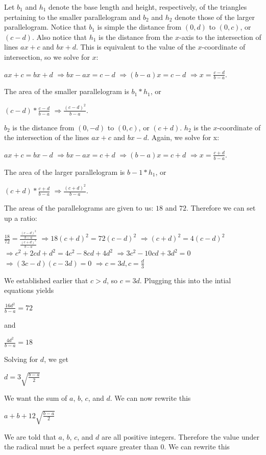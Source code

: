 \begin{enumerate}
 Let $b_1$ and $h_1$ denote the base length and height, respectively, of the triangles pertaining to the smaller parallelogram and $b_2$ and $h_2$ denote those of the larger parallelogram. Notice that $b_1$ is simple the distance from $(0, d)$ to $(0, c)$, or $(c-d)$. Also notice that $h_1$ is the distance from the $x$-axis to the intersection of lines $ax+c$ and $bx+d$. This is equivalent to the value of the $x$-coordinate of intersection, so we solve for $x$:

 
$ax+c=bx+d$
$\Rightarrow bx-ax = c-d$
$\Rightarrow (b-a)x = c-d$
$\Rightarrow x = \frac{c-d}{b-a}$.

 
The area of the smaller parallelogram is $b_1*h_1$, or

 
$(c-d) * \frac{c-d}{b-a}$
$\Rightarrow \frac{(c-d)^2}{b-a}$.

 
$b_2$ is the distance from $(0, -d)$ to $(0, c)$, or $(c+d)$. $h_2$ is the $x$-coordinate of the intersection of the lines $ax+c$ and $bx-d$. Again, we solve for x:

 
$ax+c=bx-d$
$\Rightarrow bx-ax = c+d$
$\Rightarrow (b-a)x = c+d$
$\Rightarrow x = \frac{c+d}{b-a}$.

 
The area of the larger parallelogram is $b-1*h_1$, or

 
$(c+d) * \frac{c+d}{b-a}$
$\Rightarrow \frac{(c+d)^2}{b-a}$.

 
The areas of the parallelograms are given to us: $18$ and $72$. Therefore we can set up a ratio:

 
$\frac{18}{72} = \frac{\frac{(c-d)^2}{b-a}}{\frac{(c+d)^2}{b-a}}$
$\Rightarrow 18(c+d)^2 = 72(c-d)^2$
$\Rightarrow (c+d)^2 = 4(c-d)^2$
$\Rightarrow c^2 + 2cd + d^2 = 4c^2 - 8cd + 4d^2$
$\Rightarrow 3c^2 - 10cd +3d^2 = 0$
$\Rightarrow (3c-d)(c-3d)=0$
$\Rightarrow c=3d, c=\frac{d}{3}$

 
We established earlier that $c>d$, so $c=3d$. Plugging this into the intial equations yields

 
$\frac{16d^2}{b-a} = 72$

 
and

 
$\frac{4d^2}{b-a} = 18$

 Solving for $d$, we get

 
$d = 3\sqrt{\frac{b-a}{2}}$

 
We want the sum of $a$, $b$, $c$, and $d$. We can now rewrite this

 
$a + b + 12\sqrt{\frac{b-a}{2}}$

 
We are told that $a$, $b$, $c$, and $d$ are all positive integers. Therefore the value under the radical must be a perfect square greater than 0. We can rewrite this


\end{enumerate}
